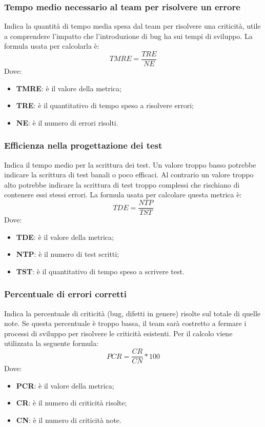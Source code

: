 \subsubsection{Tempo medio necessario al team per risolvere un errore}
Indica la quantità di tempo media spesa dal team per risolvere una criticità, utile a comprendere
l'impatto che l'introduzione di bug ha sui tempi di sviluppo. La formula usata per calcolarla è:
$$TMRE=\frac{TRE}{NE}$$
Dove:
\begin{itemize}
	\item{\textbf{TMRE}: è il valore della metrica;}
	\item{\textbf{TRE}: è il quantitativo di tempo speso a risolvere errori;}
	\item{\textbf{NE}: è il numero di errori risolti.}
\end{itemize}

\subsubsection{Efficienza nella progettazione dei test}
Indica il tempo medio per la scrittura dei test. Un valore troppo basso potrebbe indicare la scrittura di test banali o poco efficaci.
Al contrario un valore troppo alto potrebbe indicare la scrittura di test troppo complessi che rischiano di contenere essi stessi errori.
La formula usata per calcolare questa metrica è:
$$TDE=\frac{NTP}{TST}$$
Dove:
\begin{itemize}
	\item{\textbf{TDE}: è il valore della metrica;}
	\item{\textbf{NTP}: è il numero di test scritti;}
	\item{\textbf{TST}: è il quantitativo di tempo speso a scrivere test.}
\end{itemize}

\subsubsection{Percentuale di errori corretti}
Indica la percentuale di criticità (bug, difetti in genere) risolte sul totale di quelle note.
Se questa percentuale è troppo bassa, il team sarà costretto a fermare i processi di sviluppo per risolvere le criticità esistenti.
Per il calcolo viene utilizzata la seguente formula:
$$PCR=\frac{CR}{CN}*100$$
Dove:
\begin{itemize}
	\item{\textbf{PCR}: è il valore della metrica;}
	\item{\textbf{CR}: è il numero di criticità risolte;}
	\item{\textbf{CN}: è il numero di criticità note.}
\end{itemize}

